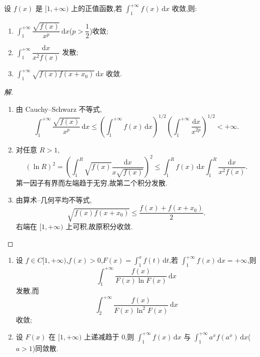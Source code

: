 \documentclass[../../数学分析培优讲义(答案版).tex]{subfiles}
\begin{document}
\begin{example}
设 $f(x)$ 是 $\lbrack 1,+\infty)$ 上的正值函数,若 $\displaystyle\int_1^{+\infty}f(x)\,\mathrm{d}x$ 收敛,则:
\begin{enumerate}[label=(\arabic*)]
    \item $\displaystyle\int_1^{+\infty}\dfrac{\sqrt{f(x)}}{x^p}\,\mathrm{d}x$($p>\dfrac{1}{2}$)收敛;
    \item $\displaystyle\int_1^{+\infty}\dfrac{\mathrm{d}x}{x^2f(x)}$ 发散;
    \item $\displaystyle\int_1^{+\infty}\sqrt{f(x)f(x+x_0)}\,\mathrm{d}x$ 收敛.
\end{enumerate}
\end{example}

\begin{proof}[解]
\begin{enumerate}[label=(\arabic*)]
    \item 由 Cauchy--Schwarz 不等式,
    \[
        \int_1^{+\infty}\dfrac{\sqrt{f(x)}}{x^p}\,\mathrm{d}x
        \leq\left(\int_1^{+\infty}f(x)\,\mathrm{d}x\right)^{1/2}
        \left(\int_1^{+\infty}\dfrac{\mathrm{d}x}{x^{2p}}\right)^{1/2}<+\infty.
    \]
    \item 对任意 $R>1$,
    \[
        (\ln R)^2
        =\left(\int_1^R\sqrt{f(x)}\dfrac{\mathrm{d}x}{x\sqrt{f(x)}}\right)^2
        \leq\int_1^Rf(x)\,\mathrm{d}x
        \int_1^R\dfrac{\mathrm{d}x}{x^2f(x)}.
    \]
    第一因子有界而左端趋于无穷,故第二个积分发散.
    \item 由算术--几何平均不等式,
    \[
        \sqrt{f(x)f(x+x_0)}\leq\dfrac{f(x)+f(x+x_0)}{2}.
    \]
    右端在 $\lbrack1,+\infty)$ 上可积,故原积分收敛.
\end{enumerate}
\end{proof}

\begin{example}
\begin{enumerate}[label=(\arabic*)]
    \item 设 $f\in C\lbrack 1,+\infty)$,$f(x)>0$,$\displaystyle F(x)=\int_1^xf(t)\,\mathrm{d}t$,若 $\displaystyle\int_1^{+\infty}f(x)\,\mathrm{d}x=+\infty$,则
    \[
        \int_1^{+\infty}\dfrac{f(x)}{F(x)\ln F(x)}\,\mathrm{d}x
    \]
    发散,而
    \[
        \int_2^{+\infty}\dfrac{f(x)}{F(x)\ln^2F(x)}\,\mathrm{d}x
    \]
    收敛;
    \item 设 $F(x)$ 在 $\lbrack 1,+\infty)$ 上递减趋于 $0$,则 $\displaystyle\int_1^{+\infty}f(x)\,\mathrm{d}x$ 与 $\displaystyle\int_1^{+\infty}a^xf(a^x)\,\mathrm{d}x$($a>1$)同敛散.
\end{enumerate}
\end{example}
\end{document}
